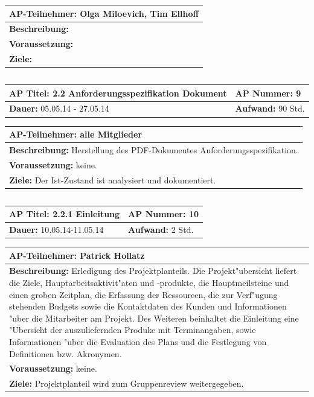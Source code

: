 \documentclass[fontsize=12pt,paper=a4,twoside]{scrartcl}
\begin{document}
\begin{tabular}{|p{15.3cm}|}
\hline
\textbf{AP-Teilnehmer: }Olga Miloevich, Tim Ellhoff\\
\hline
\textbf{Beschreibung: } \\
\hline
\textbf{Voraussetzung: }\\
\hline 
\textbf{Ziele: }\\
\hline 
\end{tabular}
\begin{verbatim}

\end{verbatim}
\begin{tabular}{|p{7.43cm}|p{7.43cm}|}
\hline
\textbf{AP Titel: }2.2 Anforderungsspezifikation Dokument & \textbf{AP Nummer: }9\\ 
\hline
\textbf{Dauer: }05.05.14 - 27.05.14 & \textbf{Aufwand: }90 Std.\\
\hline
\end{tabular}
\begin{tabular}{|p{15.3cm}|}
\hline
\textbf{AP-Teilnehmer: }alle Mitglieder\\
\hline
\textbf{Beschreibung: } Herstellung des PDF-Dokumentes Anforderungsspezifikation.\\
\hline
\textbf{Voraussetzung: }keine. \\
\hline 
\textbf{Ziele: }Der Ist-Zustand ist analysiert und dokumentiert.\\
\hline 
\end{tabular}
\begin{verbatim}

\end{verbatim}
\begin{tabular}{|p{7.43cm}|p{7.43cm}|}
\hline
\textbf{AP Titel: }2.2.1 Einleitung & \textbf{AP Nummer: }10\\ 
\hline
\textbf{Dauer: }10.05.14-11.05.14 & \textbf{Aufwand: }2 Std.\\
\hline
\end{tabular}
\begin{tabular}{|p{15.3cm}|}
\hline
\textbf{AP-Teilnehmer: }Patrick Hollatz\\
\hline
\textbf{Beschreibung: }Erledigung des Projektplanteils. Die Projekt"ubersicht liefert die Ziele, Hauptarbeitsaktivit"aten und -produkte, die Hauptmeilsteine und einen groben Zeitplan, die Erfassung der Ressourcen, die zur Verf"ugung stehenden Budgets sowie die Kontaktdaten des Kunden und Informationen "uber die Mitarbeiter am Projekt. Des Weiteren beinhaltet die Einleitung eine "Ubersicht der auszuliefernden Produke mit Terminangaben, sowie Informationen "uber die Evaluation des Plans und die Festlegung von Definitionen bzw. Akronymen.\\
\hline
\textbf{Voraussetzung: }keine.\\
\hline 
\textbf{Ziele: }Projektplanteil wird zum Gruppenreview weitergegeben.\\
\hline 
\end{tabular}
\end{document}
